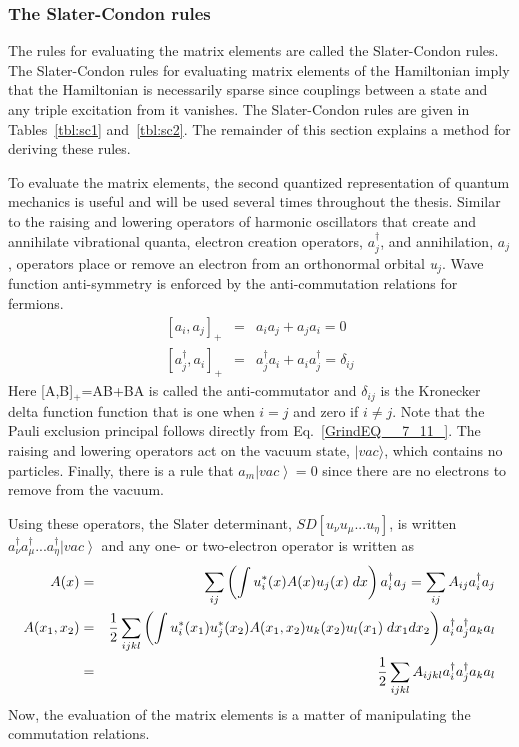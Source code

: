 \documentclass[11pt,oneside,final]{huthesis}%
\begin{document}
\subsubsection{The Slater-Condon rules }

The rules for evaluating the matrix elements are called the Slater-Condon rules.
The Slater-Condon rules for evaluating matrix elements of the Hamiltonian imply that the Hamiltonian is necessarily sparse since couplings between a state and any triple excitation from it vanishes.  The Slater-Condon rules are given in Tables~\ref{tbl:sc1} and~\ref{tbl:sc2}. The remainder of this section explains a method for deriving these rules.

To evaluate the matrix elements, the second quantized representation of quantum mechanics is useful and will be used several times throughout the thesis.  Similar to the raising and lowering operators of harmonic oscillators that create and annihilate vibrational quanta, electron creation operators, $a_{j}^{\dag } $, and annihilation, $a_{j}$, operators place or remove an electron from an orthonormal orbital \textit{u${}_{j}$}.  Wave function anti-symmetry is enforced by the anti-commutation relations for fermions. 
\begin{eqnarray} \label{GrindEQ__7_11_} 
[a_{i} ,a_{j} ]_{+} &=&a_{i} a_{j} +a_{j} a_{i} =0 \\
 \label{GrindEQ__7_12_} 
[a_{j}^{\dag } ,a_{i} ]_{+} &=&a_{j}^{\dag } a_{i} +a_{i} a_{j}^{\dag } =\delta _{ij}  
\end{eqnarray} 
Here [A,B]${}_{+}$=AB+BA is called the anti-commutator and $\delta_{ij}$ is the Kronecker delta function function that is one when $i=j$ and zero if $i\neq j$. Note that the Pauli exclusion principal follows directly from Eq.~\eqref{GrindEQ__7_11_}.  The raising and lowering operators act on the vacuum state, $|vac\rangle$, which contains no particles.  Finally, there is a rule  that $a_{m} {\left| vac \right\rangle} =0$ since there are no electrons to remove from the vacuum.  

Using these operators, the Slater determinant, $SD[u_{\nu }^{} u_{\mu }^{} ...u_{\eta }^{} ]$, is written $a_{\nu }^{\dag } a_{\mu }^{\dag } ...a_{\eta }^{\dag } {\left| vac \right\rangle} $ and any one- or two-electron operator is written as
\begin{eqnarray} \label{GrindEQ__7_13_} 
A(x)&=&\sum _{ij}\left(\int u_{i}^{*} (x)A(x)u_{j} (x){\kern 1pt} \, dx \right)a_{i}^{\dag } a_{j}  =\sum _{ij}A_{ij} a_{i}^{\dag } a_{j}\\
 A(x_{1} ,x_{2} )&=&\frac{1}{2}\sum _{ijkl}\left(\int u_{i}^{*} (x_{1} )u_{j}^{*} (x_{2} )A(x_{1} ,x_{2} )u_{k} (x_{2} )u_{l} (x_{1} ){\kern 1pt} \, dx_{1} dx_{2}  \right)a_{i}^{\dag } a_{j}^{\dag } a_{k} a_{l}\nonumber\\
&  =&\frac{1}{2}\sum _{ijkl}A_{ijkl} a_{i}^{\dag } a_{j}^{\dag } a_{k} a_{l}   \label{GrindEQ__7_14_}
\end{eqnarray} 
Now, the evaluation of the matrix elements is a matter of manipulating the commutation relations.  
\end{document}
